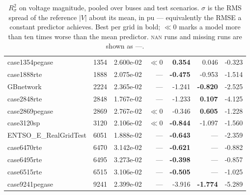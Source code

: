\documentclass[10pt]{article}
\begin{document}
\begin{table}[H]
\begin{tabular}{lrr rrrr}
case1354pegase & 1354 & 2.600e-02 & $\ll$0 & \textbf{0.354} & 0.046 & -0.323 \\
case1888rte & 1888 & 2.075e-02 & --- & \textbf{-0.475} & -0.953 & -1.514 \\
GBnetwork & 2224 & 2.365e-02 & --- & -1.241 & \textbf{-0.820} & -2.525 \\
case2848rte & 2848 & 1.767e-02 & --- & -1.233 & \textbf{0.107} & -4.125 \\
case2869pegase & 2869 & 2.767e-02 & $\ll$0 & -0.346 & \textbf{0.605} & -1.228 \\
case3120sp & 3120 & 2.106e-02 & $\ll$0 & \textbf{-0.844} & -1.097 & -1.560 \\
ENTSO\_E\_RealGridTest & 6051 & 1.888e-02 & --- & \textbf{-0.643} & --- & -2.359 \\
case6470rte & 6470 & 3.142e-02 & --- & \textbf{-0.621} & --- & -0.882 \\
case6495rte & 6495 & 3.273e-02 & --- & \textbf{-0.398} & --- & -0.857 \\
case6515rte & 6515 & 3.106e-02 & --- & \textbf{-0.505} & --- & -1.025 \\
case9241pegase & 9241 & 2.399e-02 & --- & -3.916 & \textbf{-1.774} & -5.289 \\
\bottomrule
\end{tabular}
\label{tab:r2vmag}\caption{$R^2_{\sigma}$ on voltage magnitude, pooled over buses and test scenarios. $\sigma$
is the RMS spread of the reference $|V|$ about its mean, in pu --- equivalently
the RMSE a constant predictor achieves. Best per grid in bold; $\ll$0 marks a
model more than ten times worse than the mean predictor. \textsc{nan} runs and
missing runs are shown as ---.}
\end{table}
\end{document}
